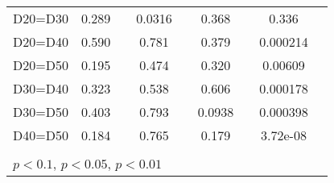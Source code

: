 \begin{tabular}{l|cccccc|cc}
D20=D30         &    0.289         &         &   0.0316         &         &    0.368         &         &    0.336         &         \\
D20=D40         &    0.590         &         &    0.781         &         &    0.379         &         & 0.000214         &         \\
D20=D50         &    0.195         &         &    0.474         &         &    0.320         &         &  0.00609         &         \\
D30=D40         &    0.323         &         &    0.538         &         &    0.606         &         & 0.000178         &         \\
D30=D50         &    0.403         &         &    0.793         &         &   0.0938         &         & 0.000398         &         \\
D40=D50         &    0.184         &         &    0.765         &         &    0.179         &         & 3.72e-08         &         \\
\hline\hline
\multicolumn{9}{p{16cm}}{\tiny }\\
\multicolumn{9}{l}{\tiny \sym{*} \(p<0.1\), \sym{**} \(p<0.05\), \sym{***} \(p<0.01\)}\\
\end{tabular}